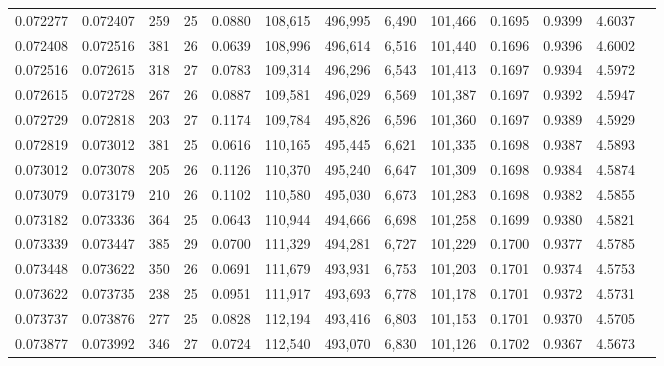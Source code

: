 \begin{tabular}{rrrrrrrrrrrrr}
0.072277 & 0.072407 & 259 &  25 &                                     0.0880 & 108,615 & 496,995 &   6,490 & 101,466 & 0.1695 & 0.9399 & 4.6037 \\
0.072408 & 0.072516 & 381 &  26 &                                     0.0639 & 108,996 & 496,614 &   6,516 & 101,440 & 0.1696 & 0.9396 & 4.6002 \\
0.072516 & 0.072615 & 318 &  27 &                                     0.0783 & 109,314 & 496,296 &   6,543 & 101,413 & 0.1697 & 0.9394 & 4.5972 \\
0.072615 & 0.072728 & 267 &  26 &                                     0.0887 & 109,581 & 496,029 &   6,569 & 101,387 & 0.1697 & 0.9392 & 4.5947 \\
0.072729 & 0.072818 & 203 &  27 &                                     0.1174 & 109,784 & 495,826 &   6,596 & 101,360 & 0.1697 & 0.9389 & 4.5929 \\
0.072819 & 0.073012 & 381 &  25 &                                     0.0616 & 110,165 & 495,445 &   6,621 & 101,335 & 0.1698 & 0.9387 & 4.5893 \\
0.073012 & 0.073078 & 205 &  26 &                                     0.1126 & 110,370 & 495,240 &   6,647 & 101,309 & 0.1698 & 0.9384 & 4.5874 \\
0.073079 & 0.073179 & 210 &  26 &                                     0.1102 & 110,580 & 495,030 &   6,673 & 101,283 & 0.1698 & 0.9382 & 4.5855 \\
0.073182 & 0.073336 & 364 &  25 &                                     0.0643 & 110,944 & 494,666 &   6,698 & 101,258 & 0.1699 & 0.9380 & 4.5821 \\
0.073339 & 0.073447 & 385 &  29 &                                     0.0700 & 111,329 & 494,281 &   6,727 & 101,229 & 0.1700 & 0.9377 & 4.5785 \\
0.073448 & 0.073622 & 350 &  26 &                                     0.0691 & 111,679 & 493,931 &   6,753 & 101,203 & 0.1701 & 0.9374 & 4.5753 \\
0.073622 & 0.073735 & 238 &  25 &                                     0.0951 & 111,917 & 493,693 &   6,778 & 101,178 & 0.1701 & 0.9372 & 4.5731 \\
0.073737 & 0.073876 & 277 &  25 &                                     0.0828 & 112,194 & 493,416 &   6,803 & 101,153 & 0.1701 & 0.9370 & 4.5705 \\
0.073877 & 0.073992 & 346 &  27 &                                     0.0724 & 112,540 & 493,070 &   6,830 & 101,126 & 0.1702 & 0.9367 & 4.5673 \\

\end{tabular}
